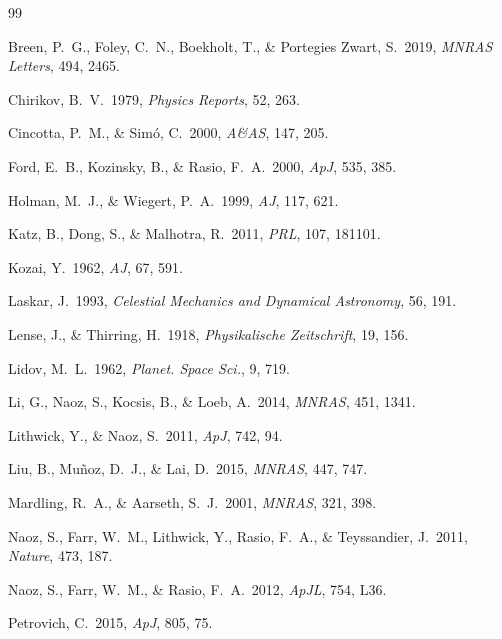 \documentclass[12pt,a4paper]{article}
\begin{document}
\begin{thebibliography}{99}

Breen, P.~G., Foley, C.~N., Boekholt, T., \& Portegies Zwart, S.\ 2019,
\textit{MNRAS Letters}, 494, 2465.

Chirikov, B.~V.\ 1979,
\textit{Physics Reports}, 52, 263.

Cincotta, P.~M., \& Sim\'o, C.\ 2000,
\textit{A\&AS}, 147, 205.

Ford, E.~B., Kozinsky, B., \& Rasio, F.~A.\ 2000,
\textit{ApJ}, 535, 385.

Holman, M.~J., \& Wiegert, P.~A.\ 1999,
\textit{AJ}, 117, 621.

Katz, B., Dong, S., \& Malhotra, R.\ 2011,
\textit{PRL}, 107, 181101.

Kozai, Y.\ 1962,
\textit{AJ}, 67, 591.

Laskar, J.\ 1993,
\textit{Celestial Mechanics and Dynamical Astronomy}, 56, 191.

Lense, J., \& Thirring, H.\ 1918,
\textit{Physikalische Zeitschrift}, 19, 156.

Lidov, M.~L.\ 1962,
\textit{Planet. Space Sci.}, 9, 719.

Li, G., Naoz, S., Kocsis, B., \& Loeb, A.\ 2014,
\textit{MNRAS}, 451, 1341.

Lithwick, Y., \& Naoz, S.\ 2011,
\textit{ApJ}, 742, 94.

Liu, B., Mu\~noz, D.~J., \& Lai, D.\ 2015,
\textit{MNRAS}, 447, 747.

Mardling, R.~A., \& Aarseth, S.~J.\ 2001,
\textit{MNRAS}, 321, 398.

Naoz, S., Farr, W.~M., Lithwick, Y., Rasio, F.~A., \& Teyssandier, J.\ 2011,
\textit{Nature}, 473, 187.

Naoz, S., Farr, W.~M., \& Rasio, F.~A.\ 2012,
\textit{ApJL}, 754, L36.

Petrovich, C.\ 2015,
\textit{ApJ}, 805, 75.


\end{thebibliography}
\end{document}
